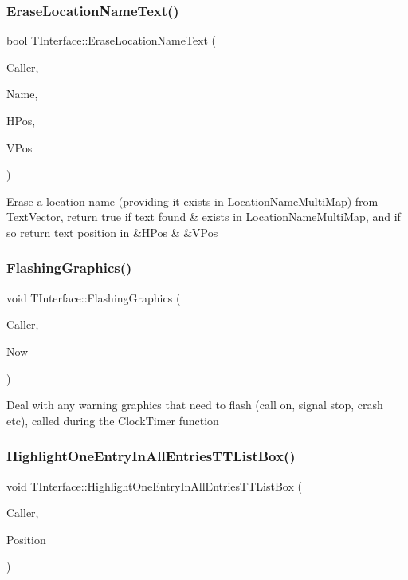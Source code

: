 \subsubsection{\texorpdfstring{Erase\+Location\+Name\+Text()}{EraseLocationNameText()}}
{\footnotesize\ttfamily bool T\+Interface\+::\+Erase\+Location\+Name\+Text (\begin{DoxyParamCaption}\item[{int}]{Caller,  }\item[{Ansi\+String}]{Name,  }\item[{int \&}]{H\+Pos,  }\item[{int \&}]{V\+Pos }\end{DoxyParamCaption})\hspace{0.3cm}{\ttfamily [private]}}

Erase a location name (providing it exists in Location\+Name\+Multi\+Map) from Text\+Vector, return true if text found \& exists in Location\+Name\+Multi\+Map, and if so return text position in \&H\+Pos \& \&V\+Pos \mbox{\label{class_t_interface_a7e6535742855a19cb3e35b1711a7ab59}} 
\subsubsection{\texorpdfstring{Flashing\+Graphics()}{FlashingGraphics()}}
{\footnotesize\ttfamily void T\+Interface\+::\+Flashing\+Graphics (\begin{DoxyParamCaption}\item[{int}]{Caller,  }\item[{T\+Date\+Time}]{Now }\end{DoxyParamCaption})\hspace{0.3cm}{\ttfamily [private]}}

Deal with any warning graphics that need to flash (call on, signal stop, crash etc), called during the Clock\+Timer function \mbox{\label{class_t_interface_a273468a729b5b2ba5dd599c5ae1a1c19}} 
\subsubsection{\texorpdfstring{Highlight\+One\+Entry\+In\+All\+Entries\+T\+T\+List\+Box()}{HighlightOneEntryInAllEntriesTTListBox()}}
{\footnotesize\ttfamily void T\+Interface\+::\+Highlight\+One\+Entry\+In\+All\+Entries\+T\+T\+List\+Box (\begin{DoxyParamCaption}\item[{int}]{Caller,  }\item[{int}]{Position }\end{DoxyParamCaption})\hspace{0.3cm}{\ttfamily [private]}}

